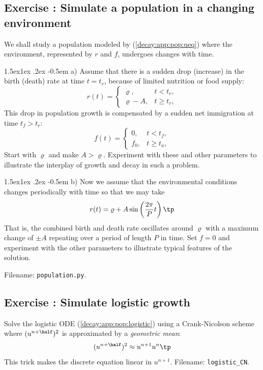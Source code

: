 \documentclass[%
oneside,                 %
final,                   %
10pt]{article}
\makeatletter
\newenvironment{doconceexercise}{}{}
\newcounter{doconceexercisecounter}
\newcommand\subex{\@startsection{paragraph}{4}{\z@}%
                  {1.5ex\@plus1ex \@minus.2ex}%
                  {-0.5em}%
                  {\normalfont\normalsize\bfseries}}
\makeatother
\begin{document}
\begin{doconceexercise}

\subsection*{Exercise \thedoconceexercisecounter: Simulate a population in a changing environment}

\label{decay:app:exer:pop:at}

We shall study a population modeled by (\ref{decay:app:pop:ueq}) where
the environment, represented by $r$ and $f$, undergoes changes with time.


\subex{a)}
Assume that there is a sudden drop (increase) in the birth (death)
rate at time $t=t_r$,
because of limited nutrition or food supply:
\[ r(t) =\left\lbrace\begin{array}{ll}
\varrho, & t < t_r,\\ 
\varrho - A, & t\geq t_r,\end{array}\right.
\]
This drop in population growth is compensated by a sudden net immigration
at time $t_f > t_r$:
\[ f(t) =\left\lbrace\begin{array}{ll}
0, & t < t_f,\\ 
f_0, & t\geq t_a,\end{array}\right.
\]
Start with $\varrho$ and make $A > \varrho$. Experiment with
these and other parameters to
illustrate the interplay of growth and decay in such a problem.

\subex{b)}
Now we assume that the environmental conditions changes periodically with
time so that we may take
\[ r(t) = {\varrho} + A\sin\left(\frac{2\pi}{P}t\right)
\tp
\]
That is, the combined birth and death rate oscillates around $\varrho$ with
a maximum change of $\pm A$ repeating over a period of length $P$ in time.
Set $f=0$ and experiment with the other parameters to illustrate typical
features of the solution.

\noindent Filename: \texttt{population.py}.

\end{doconceexercise}




\begin{doconceexercise}

\subsection*{Exercise \thedoconceexercisecounter: Simulate logistic growth}

\label{decay:app:exer:pop:logistic1}

Solve the logistic ODE
(\ref{decay:app:pop:logistic}) using a Crank-Nicolson scheme where
$(u^{n+\half})^2$ is approximated by a \emph{geometric mean}:
\[ (u^{n+\half})^2 \approx u^{n+1}u^n
\tp
\]
This trick makes the discrete equation linear in $u^{n+1}$.
\noindent Filename: \Verb!logistic_CN!.

\end{doconceexercise}
\end{document}
